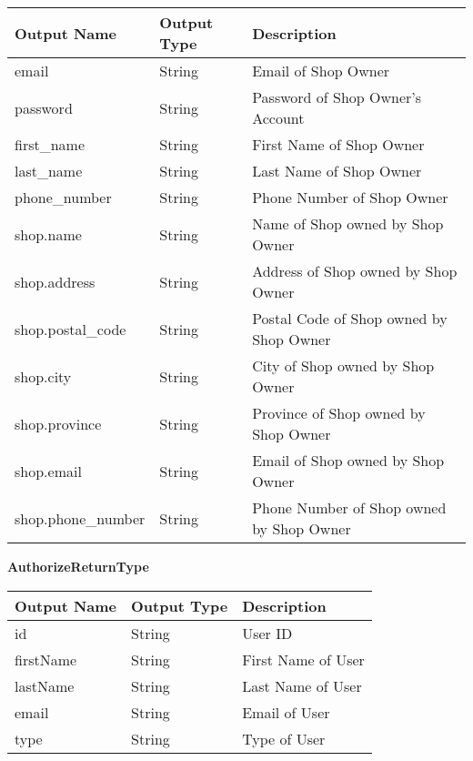 \documentclass[12pt, titlepage]{article}
\begin{document}
\begin{table}[H]
	\begin{tabular}{|p{}|p{}|p{}|}
		\hline
		\textbf{Output Name} & \textbf{Output Type} & \textbf{Description}                     \\
		\hline
		email                & String               & Email of Shop Owner                      \\
		\hline
		password             & String               & Password of Shop Owner's Account         \\
		\hline
		first\_name          & String               & First Name of Shop Owner                 \\
		\hline
		last\_name           & String               & Last Name of Shop Owner                  \\
		\hline
		phone\_number        & String               & Phone Number of Shop Owner               \\
		\hline
		shop.name            & String               & Name of Shop owned by Shop Owner         \\
		\hline
		shop.address         & String               & Address of Shop owned by Shop Owner      \\
		\hline
		shop.postal\_code    & String               & Postal Code of Shop owned by Shop Owner  \\
		\hline
		shop.city            & String               & City of Shop owned by Shop Owner         \\
		\hline
		shop.province        & String               & Province of Shop owned by Shop Owner     \\
		\hline
		shop.email           & String               & Email of Shop owned by Shop Owner        \\
		\hline
		shop.phone\_number   & String               & Phone Number of Shop owned by Shop Owner \\
		\hline
	\end{tabular}
\end{table}

\textbf{AuthorizeReturnType}

\begin{table}[H]
	\begin{tabular}{|p{}|p{}|p{}|}
		\hline
		\textbf{Output Name} & \textbf{Output Type} & \textbf{Description} \\
		\hline
		id                   & String               & User ID              \\
		\hline
		firstName            & String               & First Name of User   \\
		\hline
		lastName             & String               & Last Name of User    \\
		\hline
		email                & String               & Email of User        \\
		\hline
		type                 & String               & Type of User         \\
		\hline
	\end{tabular}
\end{table}
\end{document}
